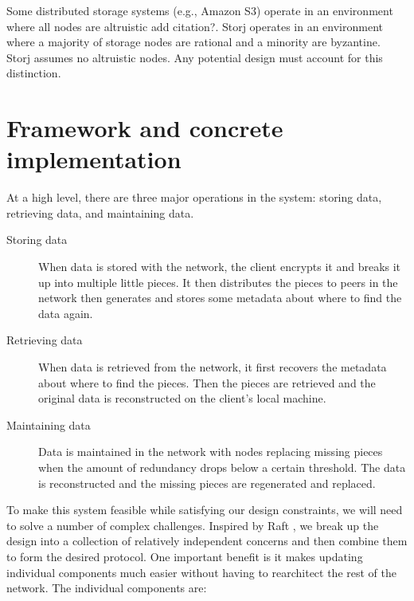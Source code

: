 \documentclass[a4paper,10pt]{article} \usepackage[utf8]{inputenc}
\begin{document}
Some distributed storage systems (e.g., Amazon S3) operate in an environment
where all nodes are altruistic {\color{red}add citation?}.
Storj operates in an environment where a
majority of storage nodes are rational and a minority are byzantine. Storj
assumes no altruistic nodes. Any
potential design must account for this distinction.

\section{Framework and concrete implementation}\label{sec:framework}

At a high level, there are three major operations in the system: storing data,
retrieving data, and maintaining data.

\begin{description}

\item[Storing data] When data is stored with the network, the client encrypts
it and breaks it up into multiple little pieces. It then distributes the pieces to peers in
the network then generates and stores some metadata about where to find the data
again.

\item[Retrieving data] When data is retrieved from the network,
it first recovers the metadata about where to find the pieces.
Then the pieces are retrieved and the original data is reconstructed
on the client's local machine.

\item[Maintaining data] Data is maintained in the network with nodes replacing
missing pieces when the amount of redundancy drops below a certain threshold.
The data is reconstructed and the missing pieces are regenerated and replaced.

\end{description}

To make this system feasible while satisfying our design constraints, we will
need to solve a number of complex challenges. Inspired by Raft \cite{raft}, we
break up the design into a collection of relatively independent concerns and
then combine them to form the desired protocol. One important benefit is it makes
updating individual components much easier without having to rearchitect the rest
of the network. The individual components are:
\end{document}
